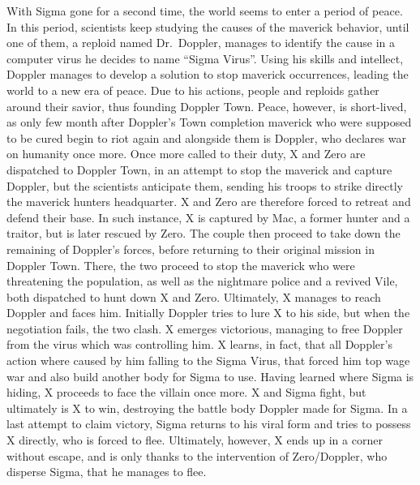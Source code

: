 With Sigma gone for a second time, the world seems to enter a period of peace. In this period, scientists keep studying the causes of the maverick behavior, until one of them, a reploid named Dr.~Doppler, manages to identify the cause in a computer virus he decides to name ``Sigma Virus''. Using his skills and intellect, Doppler manages to develop a solution to stop maverick occurrences, leading the world to a new era of peace. Due to his actions, people and reploids gather around their savior, thus founding Doppler Town. Peace, however, is short-lived, as only few month after Doppler's Town completion maverick who were supposed to be cured begin to riot again and alongside them is Doppler, who declares war on humanity once more. Once more called to their duty, X and Zero are dispatched to Doppler Town, in an attempt to stop the maverick and capture Doppler, but the scientists anticipate them, sending his troops to strike directly the maverick hunters headquarter. X and Zero are therefore forced to retreat and defend their base. In such instance, X is captured by Mac, a former hunter and a traitor, but is later rescued by Zero. The couple then proceed to take down the remaining of Doppler's forces, before returning to their original mission in Doppler Town. There, the two proceed to stop the maverick who were threatening the population, as well as the nightmare police and a revived Vile, both dispatched to hunt down X and Zero.
Ultimately, X manages to reach Doppler and faces him. Initially Doppler tries to lure X to his side, but when the negotiation fails, the two clash. X emerges victorious, managing to free Doppler from the virus which was controlling him. X learns, in fact, that all Doppler's action where caused by him falling to the Sigma Virus, that forced him top wage war and also build another body for Sigma to use. Having learned where Sigma is hiding, X proceeds to face the villain once more. X and Sigma fight, but ultimately is X to win, destroying the battle body Doppler made for Sigma. In a last attempt to claim victory, Sigma returns to his viral form and tries to possess X directly, who is forced to flee. Ultimately, however, X ends up in a corner without escape, and is only thanks to the intervention of Zero/Doppler, who disperse Sigma, that he manages to flee.


